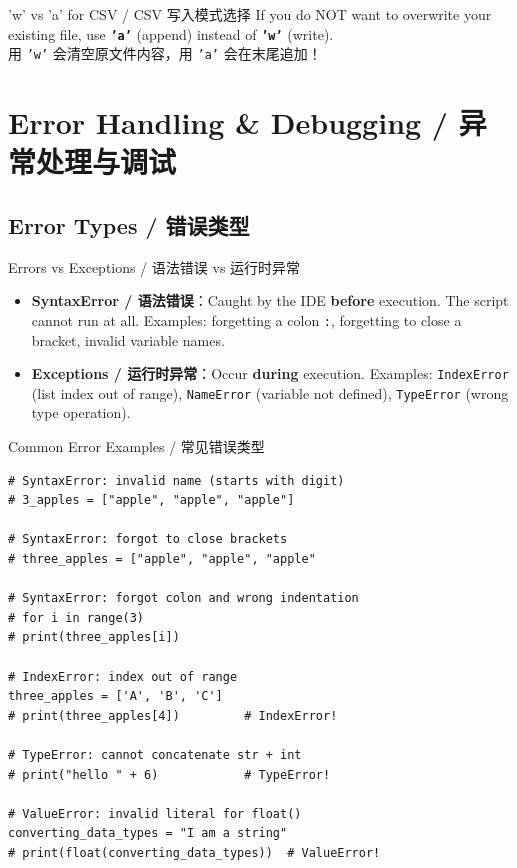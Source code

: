 \documentclass[11pt,a4paper]{article}
\begin{document}
\begin{warning}{'w' vs 'a' for CSV / CSV 写入模式选择}
    If you do NOT want to overwrite your existing file, use \textbf{\texttt{'a'}} (append) instead of \textbf{\texttt{'w'}} (write). \\
    用 \texttt{'w'} 会清空原文件内容，用 \texttt{'a'} 会在末尾追加！
\end{warning}

\section{Error Handling \& Debugging / 异常处理与调试}

\subsection{Error Types / 错误类型}

\begin{concept}{Errors vs Exceptions / 语法错误 vs 运行时异常}
    \begin{itemize}[itemsep=0.8em]
        \item \textbf{SyntaxError / 语法错误}：Caught by the IDE \textbf{before} execution. The script cannot run at all. Examples: forgetting a colon \texttt{:}, forgetting to close a bracket, invalid variable names.
        \item \textbf{Exceptions / 运行时异常}：Occur \textbf{during} execution. Examples: \texttt{IndexError} (list index out of range), \texttt{NameError} (variable not defined), \texttt{TypeError} (wrong type operation).
    \end{itemize}
\end{concept}

\begin{examplebox}{Common Error Examples / 常见错误类型}
\begin{lstlisting}
# SyntaxError: invalid name (starts with digit)
# 3_apples = ["apple", "apple", "apple"]

# SyntaxError: forgot to close brackets
# three_apples = ["apple", "apple", "apple"

# SyntaxError: forgot colon and wrong indentation
# for i in range(3)
# print(three_apples[i])

# IndexError: index out of range
three_apples = ['A', 'B', 'C']
# print(three_apples[4])         # IndexError!

# TypeError: cannot concatenate str + int
# print("hello " + 6)            # TypeError!

# ValueError: invalid literal for float()
converting_data_types = "I am a string"
# print(float(converting_data_types))  # ValueError!
\end{lstlisting}
\end{examplebox}
\end{document}
